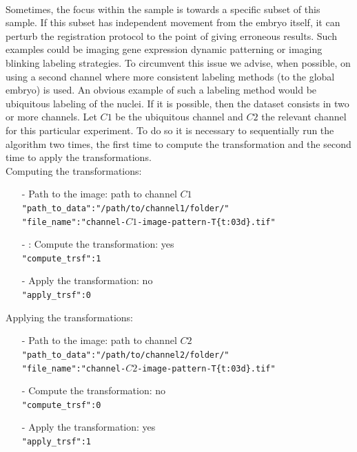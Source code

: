 \documentclass[10pt,a4paper]{article}
\begin{document}
\paragraph{}Sometimes, the focus within the sample is towards a specific subset of this sample. If this subset has independent movement from the embryo itself, it can perturb the registration protocol to the point of giving erroneous results. Such examples could be imaging gene expression dynamic patterning or imaging blinking labeling strategies. To circumvent this issue we advise, when possible, on using a second channel where more consistent labeling methods  (to the global embryo) is used. An obvious example of such a labeling method would be ubiquitous labeling of the nuclei. If it is possible, then the dataset consists in two or more channels. Let $C1$ be the ubiquitous channel and $C2$ the relevant channel for this particular experiment. To do so it is necessary to sequentially run the algorithm two times, the first time to compute the transformation and the second time to apply the transformations.\\
Computing the transformations:
	\begin{itemize}
		\item[-] Path to the image: path to channel $C1$\\
					\texttt{"path\_to\_data":"/path/to/channel1/folder/"}\\
					\texttt{"file\_name":"channel-$C1$-image-pattern-T\{t:03d\}.tif"}
		\item[-] : Compute the transformation: yes\\
					\texttt{"compute\_trsf":1}
		\item[-] Apply the transformation: no\\
					\texttt{"apply\_trsf":0}\\
	\end{itemize}
Applying the transformations:
	\begin{itemize}
		\item[-] Path to the image: path to channel $C2$\\
					\texttt{"path\_to\_data":"/path/to/channel2/folder/"}\\
					\texttt{"file\_name":"channel-$C2$-image-pattern-T\{t:03d\}.tif"}
		\item[-] Compute the transformation: no\\
					\texttt{"compute\_trsf":0}
		\item[-] Apply the transformation: yes\\
					\texttt{"apply\_trsf":1}\\
	\end{itemize}
\end{document}
